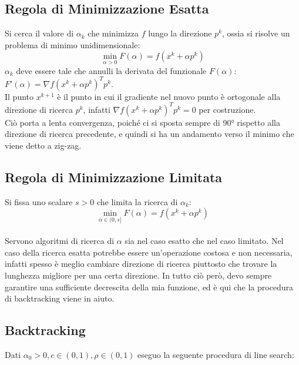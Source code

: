 \documentclass{report}
\begin{document}
\subsection{Regola di Minimizzazione Esatta}
Si cerca il valore di $\alpha_k$ che minimizza $f$ lungo la direzione $p^k$, ossia si risolve un problema di minimo unidimensionale:
\begin{equation}
    \label{min_esatta}
    \underset{\alpha>0}{\min} F(\alpha) = f(x^k + \alpha p^k)
\end{equation}
$\alpha_k$ deve essere tale che annulli la derivata del funzionale $F(\alpha)$:\\ $F'(\alpha) = \nabla f(x^k+\alpha p^k)^T p^k$.\\
Il punto $x^{k+1}$ è il punto in cui il gradiente nel nuovo punto è ortogonale alla direzione di ricerca $p^k$, infatti $\nabla f(x^k+\alpha p^k)^T p^k=0$ per costruzione.\\
Ciò porta a lenta convergenza, poiché ci si sposta sempre di \ang{90} rispetto alla direzione di ricerca precedente, e quindi si ha un andamento verso il minimo che viene detto a zig-zag. 

\subsection{Regola di Minimizzazione Limitata}
Si fissa uno scalare $s>0$ che limita la ricerca di $\alpha_k$:
\begin{equation}
    \label{min_limitata}
    \underset{\alpha \in (0,s]}{\min} F(\alpha) = f(x^k + \alpha p^k)
\end{equation}
\\
Servono algoritmi di ricerca di $\alpha$ sia nel caso esatto che nel caso limitato. Nel caso della ricerca esatta potrebbe essere un'operazione costosa e non necessaria, infatti spesso è meglio cambiare direzione di ricerca piuttosto che trovare la lunghezza migliore per una certa direzione. In tutto ciò però, devo sempre garantire una sufficiente decrescita della mia funzione, ed è qui che la procedura di backtracking viene in aiuto.

\subsection{Backtracking}
Dati $\alpha_0 > 0, c \in (0,1), \rho \in (0,1)$ eseguo la seguente procedura di line search:
\end{document}
